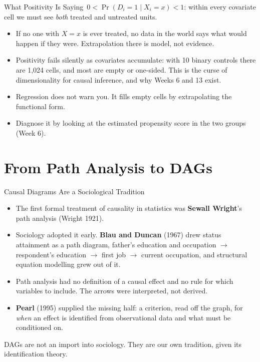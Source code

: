\documentclass[aspectratio=169,11pt,xcolor=dvipsnames]{beamer}
\newcommand{\srcp}[1]{{\scriptsize\color{gray}(#1)}}
\newcommand{\core}{\,\raisebox{0.6pt}{\textcolor{corestar}{$\bigstar$}}}
\begin{document}
\begin{frame}{What Positivity Is Saying\core}
$0 < \Pr(D_i=1 \mid X_i = x) < 1$: within every covariate cell we must see
\emph{both} treated and untreated units.
\begin{itemize}\itemsep3pt
  \item If no one with $X = x$ is ever treated, no data in the world says
        what would happen if they were. Extrapolation there is model, not
        evidence.
  \item Positivity fails silently as covariates accumulate: with 10 binary
        controls there are 1{,}024 cells, and most are empty or one-sided.
        This is the curse of dimensionality for causal inference, and why
        Weeks 6 and 13 exist.
  \item Regression does not warn you. It fills empty cells by extrapolating
        the functional form.
  \item Diagnose it by looking at the estimated propensity score in the two
        groups (Week 6).
\end{itemize}
\end{frame}

\section[Path Analysis to DAGs]{From Path Analysis to DAGs}
\begin{frame}\sectionpage\end{frame}

\begin{frame}{Causal Diagrams Are a Sociological Tradition}
\begin{itemize}\itemsep4pt
  \item The first formal treatment of causality in statistics was
        \textbf{Sewall Wright}'s path analysis \srcp{Wright 1921}.
  \item Sociology adopted it early. \textbf{Blau and Duncan} (1967) drew
        status attainment as a path diagram, father's education and
        occupation $\to$ respondent's education $\to$ first job $\to$ current
        occupation, and structural equation modelling grew out of it.
  \item Path analysis had \alert{no definition of a causal effect} and no rule
        for which variables to include. The arrows were interpreted, not
        derived.
  \item \textbf{Pearl} (1995) supplied the missing half: a criterion, read off
        the graph, for \emph{when} an effect is identified from observational
        data and what must be conditioned on.
\end{itemize}
\vskip4pt
DAGs are not an import into sociology. They are our own tradition, given its
identification theory.
\end{frame}
\end{document}
